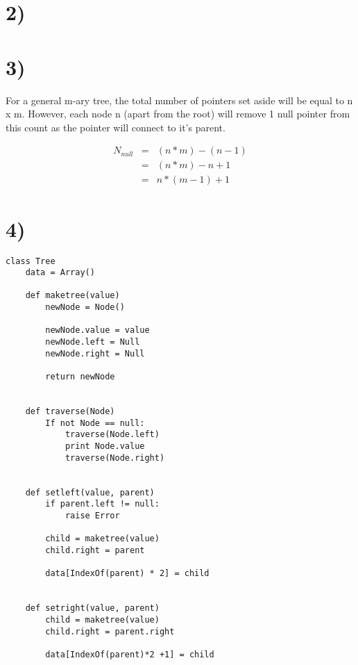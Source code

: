 \documentclass[a4paper,11pt]{article}
\begin{document}

\section*{2)}



\section*{3)} 
For a general m-ary tree, the total number of pointers set aside will be equal to n x m.  However, each node n (apart from the root) will remove 1 null pointer from this count as the pointer will connect to it's parent.

\begin{eqnarray}
N_{null} &=& (n * m) - (n - 1) \\
                &=& (n * m) - n + 1 \\
                &=& n * (m - 1) + 1 
\end{eqnarray}


\section*{4)}
\begin{verbatim}
class Tree
    data = Array()
    
    def maketree(value)
        newNode = Node()
        
        newNode.value = value
        newNode.left = Null
        newNode.right = Null
    
        return newNode
	
    
    def traverse(Node)
        If not Node == null:
            traverse(Node.left)
            print Node.value
            traverse(Node.right)
	
	
    def setleft(value, parent)
        if parent.left != null:
            raise Error
            
        child = maketree(value)
        child.right = parent
        
        data[IndexOf(parent) * 2] = child
	
	
    def setright(value, parent)    
        child = maketree(value)
        child.right = parent.right
    
        data[IndexOf(parent)*2 +1] = child
    
\end{verbatim}
\end{document}
